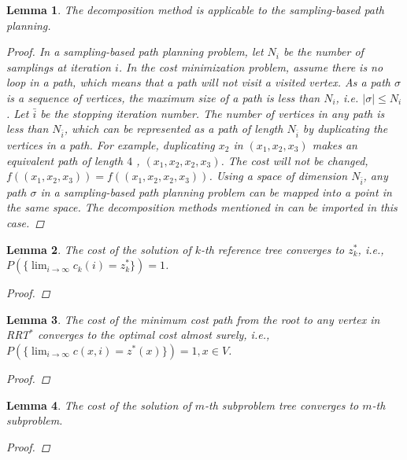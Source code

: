 \documentclass[conference]{IEEEtran}
\newtheorem{lem}{Lemma}
\theoremstyle{definition}
\begin{document}
\begin{lem}
\label{lem:moo-d:rrt}
The decomposition method is applicable to the sampling-based path planning.
\begin{proof}
In a sampling-based path planning problem, let $ N_{i} $ be the number of samplings at iteration $ i $.
In the cost minimization problem, assume there is no loop in a path, which means that a path will not visit a visited vertex.
As a path $ \sigma $ is a sequence of vertices, the maximum size of a path is less than $ N_{i} $, i.e.
$ | \sigma | \leq N_{i} $.
Let $ \bar{i} $ be the stopping iteration number.
The number of vertices in any path is less than $ N_{ \bar{i} } $, which can be represented as a path of length $ N_{ \bar{i} } $ by duplicating the vertices in a path.
For example, duplicating $ x_{2} $ in $ (x_{1} , x_{2}, x_{3} ) $ makes an equivalent path of length $ 4 $ , $ (x_{1} , x_{2},  x_{2}, x_{3} ) $.
The cost will not be changed, $ f( (x_{1} , x_{2}, x_{3}) ) = f( (x_{1} , x_{2},  x_{2}, x_{3} ) )$.
Using a space of dimension $ N_{ \bar{i} } $, any path $ \sigma $ in a sampling-based path planning problem can be mapped into a point in the same space.
The decomposition methods mentioned in \cite{4358754} can be imported in this case.		
\end{proof}
\end{lem}

\begin{lem}
\label{lem:ref_tree:conv}
The cost of the solution of $ k $-th reference tree converges to $ z^{*}_{k} $, i.e., 
$ P( \{ \lim_{ i \rightarrow \infty }  c_{k} ( i ) = z^{*}_{k}  \} ) = 1  $.
\begin{proof}

\end{proof}
\end{lem}

\begin{lem}
\label{lem:tree_vex:conv}
The cost of the minimum cost path from the root to any vertex in RRT$^{*}$ converges to the optimal cost almost surely, i.e.,
$
P( \{ \lim_{ i \rightarrow \infty } c(x, i)  = z^{*}(x) \} ) = 1, x \in V $.
\begin{proof}
\end{proof}
\end{lem}

\begin{lem}
\label{lem:sub_tree:conv}
The cost of the solution of $ m $-th subproblem tree converges to $ m $-th subproblem.
\begin{proof}
\end{proof}
\end{lem}
\end{document}
